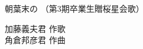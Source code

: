 \documentclass[10pt,b5j]{tarticle} %
\begin{document}
\begin{minipage}[c]{0.7\hsize} %
    \begin{center}
        {\LARGE
            朝葉末の %
        }
        {\small 
            （第3期卒業生贈桜星会歌） %
        }
    \end{center}
\end{minipage}
\begin{minipage}[c]{0.3\hsize} %
    \begin{flushright} %
        加藤義夫君 作歌\\角倉邦彦君 作曲 %
    \end{flushright}
\end{minipage}
\end{document}
